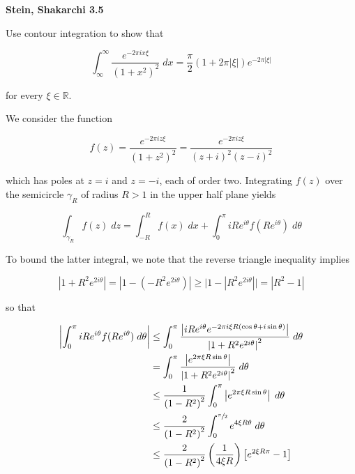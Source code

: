 \textbf{Stein, Shakarchi 3.5}

Use contour integration to show that

$$
\int_{\infty}^{\infty} { \frac{e^{-2 \pi i x \xi}}{\left( 1 + x^2 \right)^2} \; dx } = \frac{\pi}{2} (1 + 2 \pi |\xi|) e^{-2 \pi |\xi|}
$$

for every $\xi \in \mathbb{R}$.

\begin{solution}
  We consider the function 

  $$
  f(z) = \frac{e^{-2 \pi i z \xi}}{\left(1 + z^2\right)^2} = \frac{e^{-2 \pi i z \xi}}{(z + i)^2 (z - i)^2}
  $$

  which has poles at $z = i$ and $z = -i$, each of order two. Integrating $f(z)$ over the semicircle $\gamma_R$ of 
  radius $R > 1$ in the upper half plane yields

  $$
  \int_{\gamma_R} { f(z) \; dz } = \int_{-R}^{R} { f(x) \; dx } 
                                 + \int_0^{\pi} { i R e^{i \theta} f(R e^{i \theta}) \; d\theta }
  $$

  To bound the latter integral, we note that the reverse triangle inequality implies

  $$
  \left|1 + R^2 e^{2 i \theta}\right| = \left|1 - \left(-R^2 e^{2 i \theta}\right)\right| 
                                      \ge \Big| 1 - \left| R^2 e^{2 i \theta} \right| \Big| 
                                      = \left|R^2 - 1\right|
  $$

  so that

  \begin{align*}
    \left| \int_0^{\pi} { i R e^{i \theta} f(R e^{i \theta}) \; d\theta } \right|
      &\le \int_0^{\pi} { \frac{\left| i R e^{i \theta} e^{-2 \pi i \xi R (\cos{\theta} + i \sin{\theta})} \right|}{\left| 1 + R^2 e^{2 i \theta} \right|^2} \; d\theta } \\
      &= \int_0^{\pi} { \frac{\left| e^{2 \pi \xi R \sin{\theta}} \right|}{\left| 1 + R^2 e^{2 i \theta} \right|^2} \; d\theta } \\
      &\le \frac{1}{\left(1 - R^2\right)^2} \int_0^{\pi} { \left| e^{2 \pi \xi R \sin{\theta}} \right| \; d\theta } \\
      &\le \frac{2}{\left(1 - R^2\right)^2} \int_0^{\sfrac{\pi}{2}} { e^{4 \xi R \theta} \; d\theta } \\
      &\le \frac{2}{\left(1 - R^2\right)^2} \left(\frac{1}{4 \xi R} \right) \left[ e^{2 \xi R \pi} - 1 \right] 
  \end{align*}


\end{solution}
